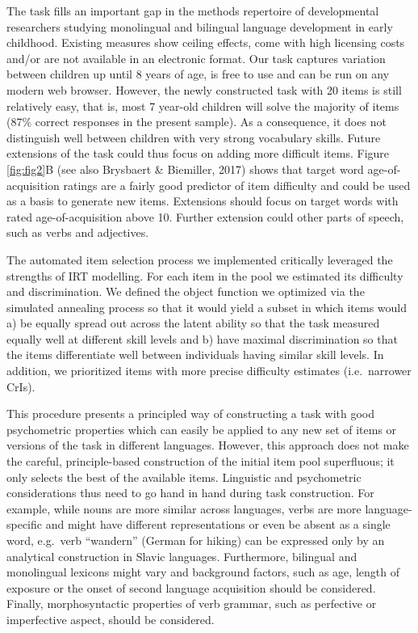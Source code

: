 \documentclass[
  man,floatsintext]{apa6}
\begin{document}
The task fills an important gap in the methods repertoire of developmental researchers studying monolingual and bilingual language development in early childhood. Existing measures show ceiling effects, come with high licensing costs and/or are not available in an electronic format. Our task captures variation between children up until 8 years of age, is free to use and can be run on any modern web browser. However, the newly constructed task with 20 items is still relatively easy, that is, most 7 year-old children will solve the majority of items (87\% correct responses in the present sample). As a consequence, it does not distinguish well between children with very strong vocabulary skills. Future extensions of the task could thus focus on adding more difficult items. Figure \ref{fig:fig2}B (see also Brysbaert \& Biemiller, 2017) shows that target word age-of-acquisition ratings are a fairly good predictor of item difficulty and could be used as a basis to generate new items. Extensions should focus on target words with rated age-of-acquisition above 10. Further extension could other parts of speech, such as verbs and adjectives.

The automated item selection process we implemented critically leveraged the strengths of IRT modelling. For each item in the pool we estimated its difficulty and discrimination. We defined the object function we optimized via the simulated annealing process so that it would yield a subset in which items would a) be equally spread out across the latent ability so that the task measured equally well at different skill levels and b) have maximal discrimination so that the items differentiate well between individuals having similar skill levels. In addition, we prioritized items with more precise difficulty estimates (i.e.~narrower CrIs).

This procedure presents a principled way of constructing a task with good psychometric properties which can easily be applied to any new set of items or versions of the task in different languages. However, this approach does not make the careful, principle-based construction of the initial item pool superfluous; it only selects the best of the available items. Linguistic and psychometric considerations thus need to go hand in hand during task construction. For example, while nouns are more similar across languages, verbs are more language-specific and might have different representations or even be absent as a single word, e.g.~verb ``wandern'' (German for hiking) can be expressed only by an analytical construction in Slavic languages. Furthermore, bilingual and monolingual lexicons might vary and background factors, such as age, length of exposure or the onset of second language acquisition should be considered. Finally, morphosyntactic properties of verb grammar, such as perfective or imperfective aspect, should be considered.
\end{document}
